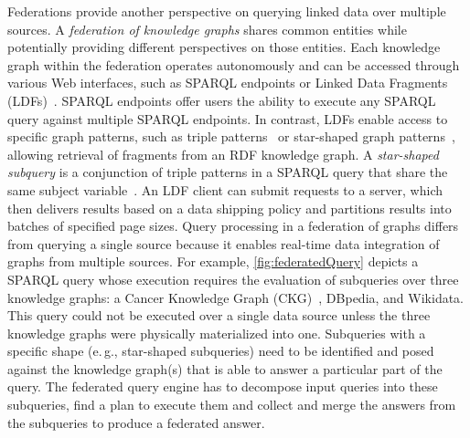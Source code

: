 \documentclass[a4paper,USenglish]{tgdk-v2021}
\newcommand{\arxivonly}[1]{}
\begin{document}
Federations provide another perspective on querying linked data over multiple sources.
A \emph{federation of knowledge graphs} shares common entities while potentially providing different perspectives on those entities. 
Each knowledge graph within the federation operates autonomously and can be accessed through various Web interfaces, such as SPARQL endpoints or Linked Data Fragments (LDFs)~\cite{DBLP:journals/ws/VerborghSHHVMHC16}. 
SPARQL endpoints offer users the ability to execute any SPARQL query against multiple SPARQL endpoints.
In contrast, LDFs enable access to specific graph patterns, such as triple patterns~\cite{DBLP:conf/semweb/VerborghHMHVSCCMW14a} or star-shaped graph patterns~\cite{DBLP:journals/corr/abs-2002-09172}, allowing retrieval of fragments from an RDF knowledge graph.
A \emph{star-shaped subquery} is a conjunction of triple patterns in a SPARQL query that share the same subject variable~\cite{DBLP:conf/esws/VidalRLMSP10}.
An LDF client can submit requests to a server, which then delivers results based on a data shipping policy and partitions results into batches of specified page sizes.
Query processing in a federation of graphs differs from querying a single source because it enables real-time data integration of graphs from multiple sources.
For example, \autoref{fig:federatedQuery} depicts a SPARQL query whose execution requires the evaluation of subqueries over three knowledge graphs: a Cancer Knowledge Graph (CKG)~\cite{DBLP:journals/semweb/AisoposJNPRSIVM23}, DBpedia, and Wikidata.
This query could not be executed over a single data source unless the three knowledge graphs were physically materialized into one. Subqueries with a specific shape (e.\,g., star-shaped subqueries) need to be identified and posed against the knowledge graph(s) that is able to answer a particular part of the query. The federated query engine has to decompose input queries into these subqueries, find a plan to execute them and collect and merge the answers from the subqueries to produce a federated answer.

\arxivonly{A federated query engine is a system designed to execute queries over a federation of graphs. 
These engines leverage advanced query optimization methods to effectively decompose an input query into subqueries that can be executed over one or more graphs within the federation. 
Furthermore, they identify the most appropriate graphs for executing each subquery.
In addition to query execution, these engines also play a crucial role in discovering and managing efficient plans that minimize the data merging costs associated with collecting information from the selected knowledge graphs.}
\end{document}
